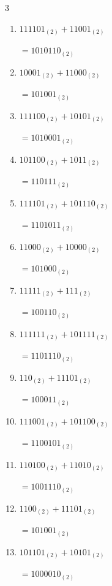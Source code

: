 \begin{multicols}{3}
\begin{enumerate}
        $=1001111_{(2)}$

  \item $111101_{(2)} + 11001_{(2)}$

        $=1010110_{(2)}$

  \item $10001_{(2)} + 11000_{(2)}$

        $=101001_{(2)}$

\columnbreak %

\resetques

  \item $111100_{(2)} + 10101_{(2)}$

        $=1010001_{(2)}$

  \item $101100_{(2)} + 1011_{(2)}$

        $=110111_{(2)}$

  \item $111101_{(2)} + 101110_{(2)}$

        $=1101011_{(2)}$

  \item $11000_{(2)} + 10000_{(2)}$

        $=101000_{(2)}$

  \item $11111_{(2)} + 111_{(2)}$

        $=100110_{(2)}$

  \item $111111_{(2)} + 101111_{(2)}$

        $=1101110_{(2)}$

  \item $110_{(2)} + 11101_{(2)}$

        $=100011_{(2)}$

  \item $111001_{(2)} + 101100_{(2)}$

        $=1100101_{(2)}$

  \item $110100_{(2)} + 11010_{(2)}$

        $=1001110_{(2)}$

  \item $1100_{(2)} + 11101_{(2)}$

        $=101001_{(2)}$

\columnbreak %

  \item $101101_{(2)} + 10101_{(2)}$

        $=1000010_{(2)}$


\end{enumerate}
\end{multicols}
